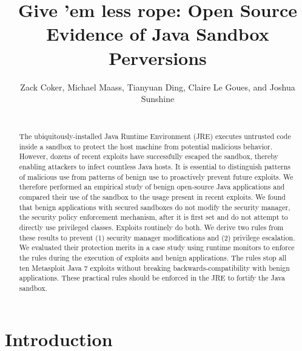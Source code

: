 \documentclass{sig-alternate}
\begin{document}

\title{Give 'em less rope: Open Source Evidence of Java Sandbox Perversions}

\author{\alignauthor Zack Coker, Michael Maass, Tianyuan Ding, Claire Le Goues, and Joshua Sunshine \\
 \\
} 

\maketitle
\thispagestyle{plain} 
\pagestyle{plain}
\begin{abstract}
The ubiquitously-installed Java Runtime Environment (JRE) executes
untrusted code inside a sandbox to protect the host machine from potential
malicious behavior. However, dozens of recent exploits have successfully
escaped the sandbox, thereby enabling attackers to infect countless
Java hosts. It is essential to distinguish patterns of malicious use
from patterns of benign use to proactively prevent future exploits.
We therefore performed an empirical study of benign open-source Java
applications and compared their use of the sandbox to the usage present
in recent exploits. We found that benign applications with secured
sandboxes do not modify the security manager, the security policy
enforcement mechanism, after it is first set and do not attempt to
directly use privileged classes. Exploits routinely do both. We derive two rules from these results to prevent (1) security manager modifications and (2) privilege escalation. We evaluated their protection merits in a case study using runtime monitors to enforce the rules during the execution of exploits and benign applications. The rules stop all ten Metasploit Java 7 exploits without breaking backwards-compatibility with benign applications. These practical rules should be enforced in the JRE to fortify the Java sandbox.
\end{abstract}

\section{Introduction}
\end{document}
